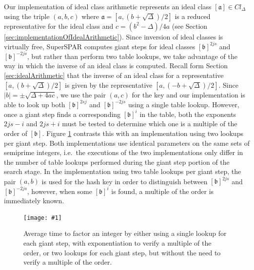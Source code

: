\documentclass{ucalgthes1}
\theoremstyle{definition}
\newcommand{\ideal}{\mathfrak}
\newcommand{\idealclass}[1]{\left[ \ideal #1 \right]}
\newcommand{\aclass}{\idealclass a}
\newcommand{\bclass}{\idealclass b}
\newcommand{\mygraphX}[4]{
	\begin{figure}[htb]
	\centering
	\texttt{[image: \#1]}
	\caption[#4]{#3}
	\label{#2}
	\end{figure}
}
\begin{document}
Our implementation of ideal class arithmetic represents an ideal class $\aclass \in Cl_\Delta$ using the triple $(a, b, c)$ where $\ideal a = [a, (b + \sqrt\Delta)/2]$ is a reduced representative for the ideal class and $c = (b^2 - \Delta)/4a$ (see Section \ref{sec:implementationOfIdealArithmetic}).  Since inversion of ideal classes is virtually free, SuperSPAR computes giant steps for ideal classes $\bclass^{2js}$ and $\bclass^{-2js}$, but rather than perform two table lookups, we take advantage of the way in which the inverse of an ideal class is computed.  Recall form Section \ref{sec:idealArithmetic} that the inverse of an ideal class for a representative $[a, (b + \sqrt\Delta)/2]$ is given by the representative $[a, (-b + \sqrt\Delta)/2]$.  Since $|b| = \pm \sqrt{\Delta +4ac}$, we use the pair $(a, c)$ for the key and our implementation is able to look up both $\bclass^{2sj}$ and $\bclass^{-2js}$ using a single table lookup.  However, once a giant step finds a corresponding $\bclass^i$ in the table, both the exponents $2js-i$ and $2js+i$ must be tested to determine which one is a multiple of the order of $\bclass$.  Figure \ref{fig:ssparSingleLookup} contrasts this with an implementation using two lookups per giant step.  Both implementations use identical parameters on the same sets of semiprime integers, i.e.\ the executions of the two implementations only differ in the number of table lookups performed during the giant step portion of the search stage.  In the implementation using two table lookups per giant step, the pair $(a, b)$ is used for the hash key in order to distinguish between $\bclass^{2js}$ and $\bclass^{-2js}$, however, when some $\bclass^i$ is found, a multiple of the order is immediately known.

\mygraphX{hashing-single-vs-double}{fig:ssparSingleLookup}{Average time to factor an integer by either using a single lookup for each giant step, with exponentiation to verify a multiple of the order, or two lookups for each giant step, but without the need to verify a multiple of the order.}{Inversion aware hashing.}
\end{document}

